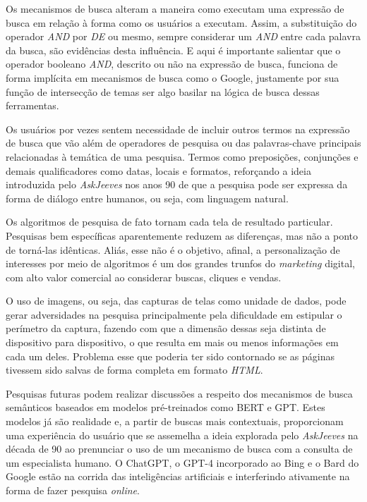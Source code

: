 \documentclass[portuguese]{textolivre}
\begin{document}
Os mecanismos de busca alteram a maneira como executam uma expressão de busca em relação à forma como os usuários a executam. Assim, a substituição do operador \textit{AND} por \textit{DE} ou mesmo, sempre considerar um \textit{AND} entre cada palavra da busca, são evidências desta influência. E aqui é importante salientar que o operador booleano \textit{AND}, descrito ou não na expressão de busca, funciona de forma implícita em mecanismos de busca como o Google, justamente por sua função de intersecção de temas ser algo basilar na lógica de busca dessas ferramentas.

Os usuários por vezes sentem necessidade de incluir outros termos na expressão de busca que vão além de operadores de pesquisa ou das palavras-chave principais relacionadas à temática de uma pesquisa. Termos como preposições, conjunções e demais qualificadores como datas, locais e formatos, reforçando a ideia introduzida pelo \textit{AskJeeves} nos anos 90 de que a pesquisa pode ser expressa da forma de diálogo entre humanos, ou seja, com linguagem natural.

Os algoritmos de pesquisa de fato tornam cada tela de resultado particular. Pesquisas bem específicas aparentemente reduzem as diferenças, mas não a ponto de torná-las idênticas. Aliás, esse não é o objetivo, afinal, a personalização de interesses por meio de algoritmos é um dos grandes trunfos do \textit{marketing} digital, com alto valor comercial ao considerar buscas, cliques e vendas.

O uso de imagens, ou seja, das capturas de telas como unidade de dados, pode gerar adversidades na pesquisa principalmente pela dificuldade em estipular o perímetro da captura, fazendo com que a dimensão dessas seja distinta de dispositivo para dispositivo, o que resulta em mais ou menos informações em cada um deles. Problema esse que poderia ter sido contornado se as páginas tivessem sido salvas de forma completa em formato \textit{HTML}.

Pesquisas futuras podem realizar discussões a respeito dos mecanismos de busca semânticos baseados em modelos pré-treinados como BERT e GPT. Estes modelos já são realidade e, a partir de buscas mais contextuais, proporcionam uma experiência do usuário que se assemelha a ideia explorada pelo \textit{AskJeeves} na década de 90 ao prenunciar o uso de um mecanismo de busca com a consulta de um especialista humano. O ChatGPT, o GPT-4 incorporado ao Bing e o Bard do Google estão na corrida das inteligências artificiais e interferindo ativamente na forma de fazer pesquisa \textit{online}.
\end{document}
